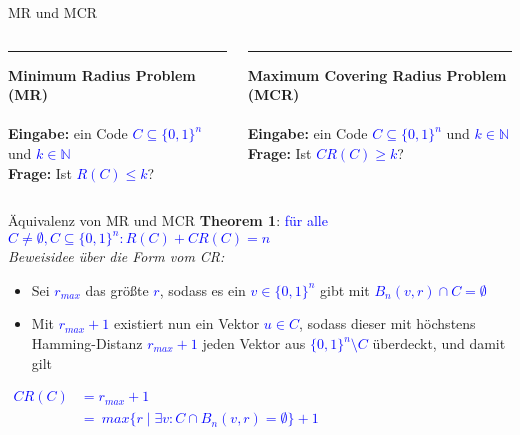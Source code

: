 \documentclass[10pt, aspectratio=169]{beamer}
\begin{document}
\begin{frame}{MR und MCR}
\begin{columns}[T] %
\begin{column}{.48\textwidth}

\color{red}\rule{\linewidth}{1pt}

\textbf{Minimum Radius Problem (MR)}\\~\\
\color{black}
\textbf{Eingabe:} ein Code  \textcolor{blue}{$C \subseteq \{0,1\}^n $} und \textcolor{blue}{$k \in \mathbb{N}$}\\
\textbf{Frage:} Ist \textcolor{blue}{$R(C)\le k$}?



\end{column}%
\hfill%

\begin{column}{.48\textwidth}
\color{red}\rule{\linewidth}{1pt}

\textbf{Maximum Covering Radius Problem (MCR)}\\~\\
\color{black}
\textbf{Eingabe:} ein Code  \textcolor{blue}{$C \subseteq \{0,1\}^n$} und \textcolor{blue}{$k \in \mathbb{N}$}\\
\textbf{Frage:} Ist \textcolor{blue}{$CR(C)\geq k$}?
\end{column}%
\end{columns}


\end{frame}




\begin{frame}{Äquivalenz von MR und MCR}
\textbf{Theorem 1}: \textcolor{blue}{ für alle $ C \neq \emptyset,C \subseteq \{0,1\}^n: R(C) + CR(C) = n$ }\\
\textit{Beweisidee über die Form vom CR:}\\
\begin{itemize}
    \item Sei \textcolor{blue}{$r_{max}$} das größte \textcolor{blue}{$r$}, sodass es ein \textcolor{blue}{$v \in \{0,1\}^n$} gibt mit \textcolor{blue}{$B_n(v,r) \cap C = \emptyset$}
    
    \item Mit \textcolor{blue}{$r_{max} + 1$} existiert nun ein Vektor \textcolor{blue}{$u \in C $}, sodass dieser mit höchstens Hamming-Distanz \textcolor{blue}{$r_{max} + 1$} jeden Vektor aus \textcolor{blue}{$\{0,1\}^n \setminus C$} überdeckt, und damit gilt
\end{itemize}
\vspace{2em}
\centering
\textcolor{blue}{
  $\begin{aligned}
        CR(C) &= r_{max}+1 \\ &= \ max\{r \mid \exists v: C \cap B_n(v,r) = \emptyset\}+1
  \end{aligned}$
  }
\end{frame}
\end{document}
